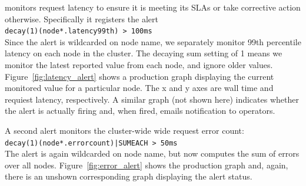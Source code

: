 \ES monitors request latency to ensure it is meeting its SLAs or take
corrective action otherwise.  Specifically it registers the alert \\
\texttt{decay(1)(node*.latency99th) > 100ms}  \\
Since the alert is wildcarded on node name, we separately monitor 99th
percentile latency on each node in the \ES cluster.  The decaying sum setting of 1
means we monitor the latest reported value from each node, and ignore older
values.  Figure~\ref{fig:latency_alert} shows a production graph displaying the current monitored value for a
particular \ES node.  The x and y axes are wall time and requiest latency,
respectively.  A similar graph (not shown here) indicates whether the
alert is actually firing and, when fired, emails notification to \ES operators.

A second alert monitors the cluster-wide wide request error count: \\
\texttt{decay(1)(node*.errorcount)|SUMEACH > 50ms}  \\
The alert is again wildcarded on node name, but now computes the sum of errors
over all nodes.  Figure~\ref{fig:error_alert} shows the production graph and,
again, there is an unshown corresponding graph displaying the alert status.

